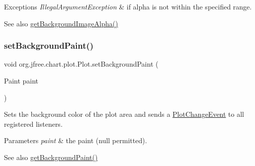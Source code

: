 \begin{DoxyExceptions}{Exceptions}
{\em Illegal\+Argument\+Exception} & if {\ttfamily alpha} is not within the specified range.\\
\hline
\end{DoxyExceptions}
\begin{DoxySeeAlso}{See also}
\mbox{\hyperlink{classorg_1_1jfree_1_1chart_1_1plot_1_1_plot_a20cf4bf1ab215cef716eac03f336879c}{get\+Background\+Image\+Alpha()}} 
\end{DoxySeeAlso}
\mbox{\label{classorg_1_1jfree_1_1chart_1_1plot_1_1_plot_a11a93f1c355ca548ad6b8c6e5b43241d}} 
\subsubsection{\texorpdfstring{set\+Background\+Paint()}{setBackgroundPaint()}}
{\footnotesize\ttfamily void org.\+jfree.\+chart.\+plot.\+Plot.\+set\+Background\+Paint (\begin{DoxyParamCaption}\item[{Paint}]{paint }\end{DoxyParamCaption})}

Sets the background color of the plot area and sends a \mbox{\hyperlink{}{Plot\+Change\+Event}} to all registered listeners.


\begin{DoxyParams}{Parameters}
{\em paint} & the paint ({\ttfamily null} permitted).\\
\hline
\end{DoxyParams}
\begin{DoxySeeAlso}{See also}
\mbox{\hyperlink{classorg_1_1jfree_1_1chart_1_1plot_1_1_plot_aea2235170b06d5107e49522a96d7d19f}{get\+Background\+Paint()}} 
\end{DoxySeeAlso}
\mbox{\label{classorg_1_1jfree_1_1chart_1_1plot_1_1_plot_a519687029156c44ed1874e3b4cf43122}} 
